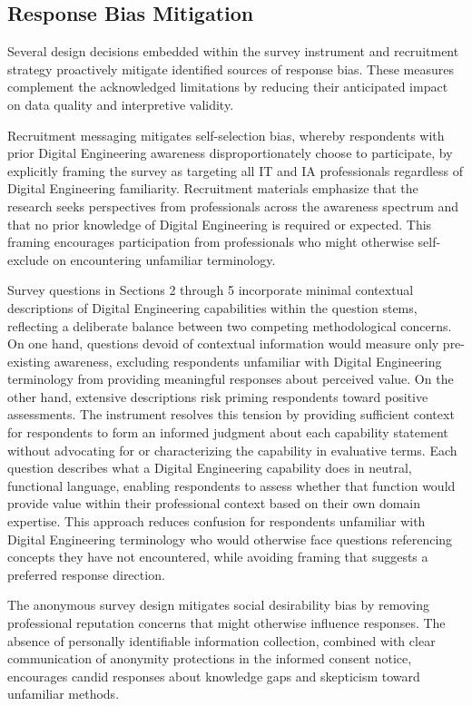 \subsection{Response Bias Mitigation}

Several design decisions embedded within the survey instrument and recruitment strategy proactively mitigate identified sources of response bias. These measures complement the acknowledged limitations by reducing their anticipated impact on data quality and interpretive validity.

Recruitment messaging mitigates self-selection bias, whereby respondents with prior Digital Engineering awareness disproportionately choose to participate, by explicitly framing the survey as targeting all IT and IA professionals regardless of Digital Engineering familiarity. Recruitment materials emphasize that the research seeks perspectives from professionals across the awareness spectrum and that no prior knowledge of Digital Engineering is required or expected. This framing encourages participation from professionals who might otherwise self-exclude on encountering unfamiliar terminology.

Survey questions in Sections 2 through 5 incorporate minimal contextual descriptions of Digital Engineering capabilities within the question stems, reflecting a deliberate balance between two competing methodological concerns. On one hand, questions devoid of contextual information would measure only pre-existing awareness, excluding respondents unfamiliar with Digital Engineering terminology from providing meaningful responses about perceived value. On the other hand, extensive descriptions risk priming respondents toward positive assessments. The instrument resolves this tension by providing sufficient context for respondents to form an informed judgment about each capability statement without advocating for or characterizing the capability in evaluative terms. Each question describes what a Digital Engineering capability does in neutral, functional language, enabling respondents to assess whether that function would provide value within their professional context based on their own domain expertise. This approach reduces confusion for respondents unfamiliar with Digital Engineering terminology who would otherwise face questions referencing concepts they have not encountered, while avoiding framing that suggests a preferred response direction.

The anonymous survey design mitigates social desirability bias by removing professional reputation concerns that might otherwise influence responses. The absence of personally identifiable information collection, combined with clear communication of anonymity protections in the informed consent notice, encourages candid responses about knowledge gaps and skepticism toward unfamiliar methods.

